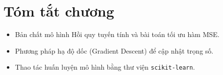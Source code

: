 \section{Tóm tắt chương}
\begin{itemize}
    \item Bản chất mô hình Hồi quy tuyến tính và bài toán tối ưu hàm MSE.
    \item Phương pháp hạ độ dốc (Gradient Descent) để cập nhật trọng số.
    \item Thao tác huấn luyện mô hình bằng thư viện \texttt{scikit-learn}.
\end{itemize}